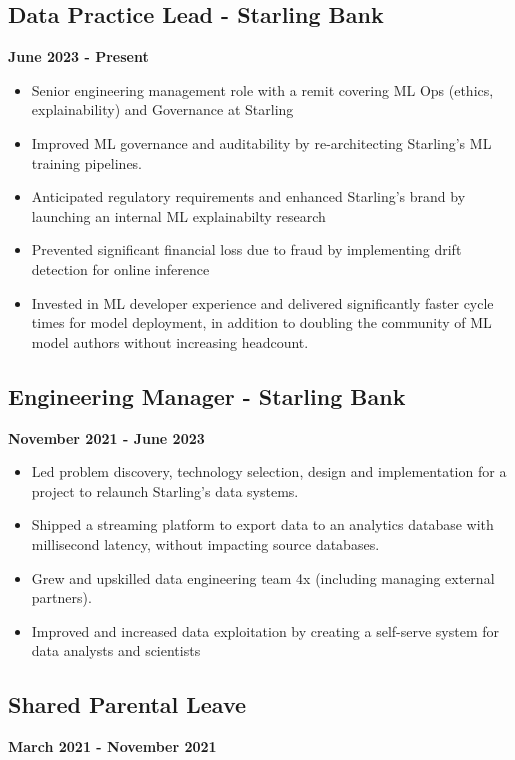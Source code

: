 \documentclass[a4paper]{scrartcl}
\begin{document}
\subsection*{Data Practice Lead - Starling Bank}
\textbf{June 2023 - Present}
\begin{itemize}
      \item Senior engineering management role with a remit covering ML Ops
            (ethics,
            explainability) and Governance at Starling
      \item Improved ML governance and auditability by re-architecting
            Starling's ML training pipelines.
      \item Anticipated regulatory requirements and enhanced Starling's brand
            by launching an internal ML explainabilty research
      \item Prevented significant financial loss due to fraud by implementing
            drift detection for online inference
      \item Invested in ML developer experience and delivered significantly
            faster cycle times for model deployment, in addition to doubling the community
            of ML model authors without increasing headcount.
\end{itemize}

\subsection*{Engineering Manager - Starling Bank}
\textbf{November 2021 - June 2023}
\begin{itemize}
      \item Led problem discovery, technology selection, design and
            implementation for a project to relaunch Starling's data systems.
      \item Shipped a streaming platform to export data to an analytics
            database
            with millisecond latency, without impacting source databases.
      \item Grew and upskilled data engineering team 4x (including managing
            external partners).
      \item Improved and increased data exploitation by creating a self-serve
            system for data analysts and scientists
\end{itemize}

\subsection*{Shared Parental Leave}
\textbf{March 2021 - November 2021}
\end{document}
